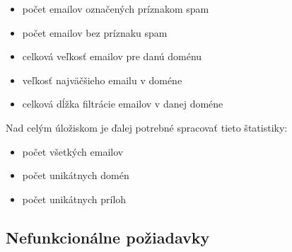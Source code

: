 \documentclass[11pt,twoside,a4paper]{book}
\begin{document}
\begin{itemize}
  \item
  počet emailov označených príznakom spam
  \item
  počet emailov bez príznaku spam
  \item
  celková veľkosť emailov pre danú doménu
  \item
  veľkosť najväčšieho emailu v doméne
  \item 
  celková dĺžka filtrácie emailov v danej doméne %
\end{itemize}
\noindent
Nad celým úložiskom je ďalej potrebné spracovať tieto štatistiky:
\begin{itemize}
  \item
  počet všetkých emailov
  \item 
  počet unikátnych domén
  \item
  počet unikátnych príloh
\end{itemize}






\subsection{Nefunkcionálne požiadavky}
\end{document}
